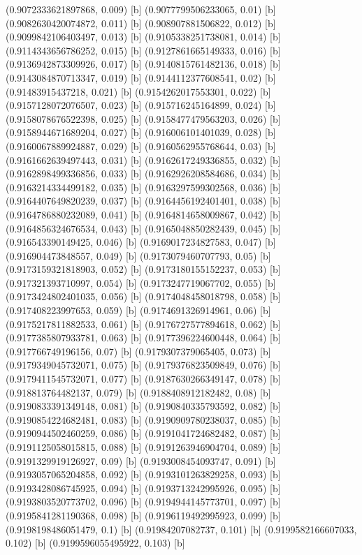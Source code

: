 {{{(0.9072333621897868, 0.009) [b] 
(0.9077799506233065, 0.01) [b] 
(0.9082630420074872, 0.011) [b] 
(0.908907881506822, 0.012) [b] 
(0.9099842106403497, 0.013) [b] 
(0.9105338251738081, 0.014) [b] 
(0.9114343656786252, 0.015) [b] 
(0.9127861665149333, 0.016) [b] 
(0.9136942873309926, 0.017) [b] 
(0.9140815761482136, 0.018) [b] 
(0.9143084870713347, 0.019) [b] 
(0.9144112377608541, 0.02) [b] 
(0.91483915437218, 0.021) [b] 
(0.9154262017553301, 0.022) [b] 
(0.9157128072076507, 0.023) [b] 
(0.915716245164899, 0.024) [b] 
(0.9158078676522398, 0.025) [b] 
(0.9158477479563203, 0.026) [b] 
(0.9158944671689204, 0.027) [b] 
(0.916006101401039, 0.028) [b] 
(0.9160067889924887, 0.029) [b] 
(0.9160562955768644, 0.03) [b] 
(0.9161662639497443, 0.031) [b] 
(0.9162617249336855, 0.032) [b] 
(0.9162898499336856, 0.033) [b] 
(0.9162926208584686, 0.034) [b] 
(0.9163214334499182, 0.035) [b] 
(0.9163297599302568, 0.036) [b] 
(0.9164407649820239, 0.037) [b] 
(0.9164456192401401, 0.038) [b] 
(0.9164786880232089, 0.041) [b] 
(0.9164814658009867, 0.042) [b] 
(0.9164856324676534, 0.043) [b] 
(0.9165048850282439, 0.045) [b] 
(0.916543390149425, 0.046) [b] 
(0.9169017234827583, 0.047) [b] 
(0.916904473848557, 0.049) [b] 
(0.9173079460707793, 0.05) [b] 
(0.9173159321818903, 0.052) [b] 
(0.9173180155152237, 0.053) [b] 
(0.917321393710997, 0.054) [b] 
(0.9173247719067702, 0.055) [b] 
(0.9173424802401035, 0.056) [b] 
(0.9174048458018798, 0.058) [b] 
(0.917408223997653, 0.059) [b] 
(0.9174691326914961, 0.06) [b] 
(0.9175217811882533, 0.061) [b] 
(0.9176727577894618, 0.062) [b] 
(0.9177385807933781, 0.063) [b] 
(0.9177396224600448, 0.064) [b] 
(0.917766749196156, 0.07) [b] 
(0.9179307379065405, 0.073) [b] 
(0.9179349045732071, 0.075) [b] 
(0.9179376823509849, 0.076) [b] 
(0.9179411545732071, 0.077) [b] 
(0.9187630266349147, 0.078) [b] 
(0.918813764482137, 0.079) [b] 
(0.9188408912182482, 0.08) [b] 
(0.9190833391349148, 0.081) [b] 
(0.9190840335793592, 0.082) [b] 
(0.9190854224682481, 0.083) [b] 
(0.9190909780238037, 0.085) [b] 
(0.9190944502460259, 0.086) [b] 
(0.9191041724682482, 0.087) [b] 
(0.9191125058015815, 0.088) [b] 
(0.9191263946904704, 0.089) [b] 
(0.9191329919126927, 0.09) [b] 
(0.9193008454093747, 0.091) [b] 
(0.9193057065204858, 0.092) [b] 
(0.9193101263829258, 0.093) [b] 
(0.9193428086745925, 0.094) [b] 
(0.9193713242995926, 0.095) [b] 
(0.9193803520773702, 0.096) [b] 
(0.9194944145773701, 0.097) [b] 
(0.9195841281190368, 0.098) [b] 
(0.9196119492995923, 0.099) [b] 
(0.9198198486051479, 0.1) [b] 
(0.91984207082737, 0.101) [b] 
(0.9199582166607033, 0.102) [b] 
(0.9199596055495922, 0.103) [b] 
}}}
